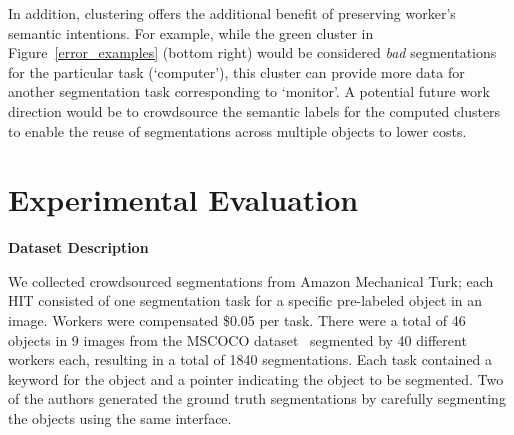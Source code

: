 \documentclass[letterpaper]{article}
\newcommand{\techreport}[1]{}
\newcommand{\agp}[1]{\textcolor{magenta}{Aditya: #1}}
\newcommand{\dor}[1]{\textcolor{blue}{Doris: #1}}
\newcommand{\stitle}[1]{\noindent \textbf{#1}}
\begin{document}
\par In addition, clustering offers the additional benefit of preserving worker's semantic intentions. For example, while the green cluster in Figure~\ref{error_examples} (bottom right) would be considered \textit{bad} segmentations for the particular task (`computer'), this cluster can provide more data for another segmentation task corresponding to `monitor'. A potential future work direction would be to crowdsource the semantic labels for the computed clusters to enable the reuse of segmentations across multiple objects to lower costs.%

\section{Experimental Evaluation\label{sec:experiment}}

\stitle{Dataset Description\label{dataset}}
\par \noindent We collected crowdsourced segmentations from Amazon Mechanical Turk; each HIT consisted of one segmentation task for a specific pre-labeled object in an image. Workers were compensated \$0.05 per task. There were a total of 46 objects in 9 images from the MSCOCO dataset~\cite{Lin2014} segmented by 40 different workers each, resulting in a total of 1840 segmentations. Each task contained a keyword for the object and a pointer indicating the object to be segmented. Two of the authors generated the ground truth segmentations by carefully segmenting the objects using the same interface. %
\techreport{\par A sub-sampled dataset was created from the full dataset to determine the efficacy of these algorithms on varying number of worker responses. Every object was randomly sampled worker with replacement. For small worker samples, we average our results over larger number of batches than for large worker samples (which have lower variance, since the sample size is close to the original data size).}
\end{document}
